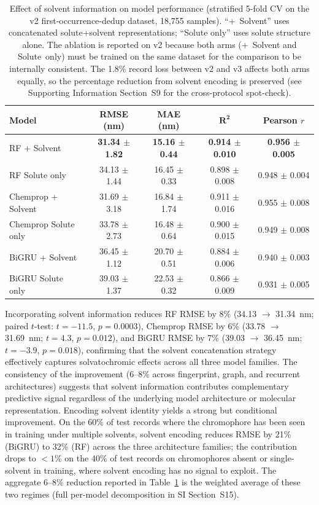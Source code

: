 \documentclass[journal=jcisd8,manuscript=article]{achemso}
\newcommand{\added}[1]{{\color{addedblue}#1}}
\newcommand{\removed}[1]{{\color{removedred}#1}}
\begin{document}
\begin{table}[htbp]
\centering
\caption{Effect of solvent information on model performance (stratified 5-fold CV \added{on the v2 first-occurrence-dedup dataset, 18{,}755 samples}). ``+~Solvent'' uses concatenated solute+solvent representations; ``Solute only'' uses solute structure alone.\added{ The ablation is reported on v2 because both arms (+~Solvent and Solute~only) must be trained on the same dataset for the comparison to be internally consistent. The 1.8\% record loss between v2 and v3 affects both arms equally, so the percentage reduction from solvent encoding is preserved (see Supporting Information Section~S9 for the cross-protocol spot-check).}}
\label{tab:solvent_ablation}
\begin{tabular}{lcccc}
\toprule
\textbf{Model} & \textbf{RMSE (nm)} & \textbf{MAE (nm)} & $\boldsymbol{R^2}$ & \textbf{Pearson $r$} \\
\midrule
RF + Solvent & \textbf{31.34 $\pm$ 1.82} & \textbf{15.16 $\pm$ 0.44} & \textbf{0.914 $\pm$ 0.010} & \textbf{0.956 $\pm$ 0.005} \\
RF Solute only & 34.13 $\pm$ 1.44 & 16.45 $\pm$ 0.33 & 0.898 $\pm$ 0.008 & 0.948 $\pm$ 0.004 \\
\midrule
Chemprop + Solvent & 31.69 $\pm$ 3.18 & 16.84 $\pm$ 1.74 & 0.911 $\pm$ 0.016 & 0.955 $\pm$ 0.008 \\
Chemprop Solute only & 33.78 $\pm$ 2.73 & 16.48 $\pm$ 0.64 & 0.900 $\pm$ 0.015 & 0.949 $\pm$ 0.008 \\
\midrule
BiGRU + Solvent & 36.45 $\pm$ 1.12 & 20.70 $\pm$ 0.51 & 0.884 $\pm$ 0.006 & 0.940 $\pm$ 0.003 \\
BiGRU Solute only & 39.03 $\pm$ 1.37 & 22.53 $\pm$ 0.32 & 0.866 $\pm$ 0.009 & 0.931 $\pm$ 0.005 \\
\bottomrule
\end{tabular}
\end{table}

Incorporating solvent information reduces RF RMSE by 8\% (34.13 $\to$ 31.34~nm; paired $t$-test: $t = -11.5$, $p = 0.0003$), Chemprop RMSE by 6\% (33.78 $\to$ 31.69~nm; $t = 4.3$, $p = 0.012$), and BiGRU RMSE by 7\% (39.03 $\to$ 36.45~nm; $t = -3.9$, $p = 0.018$), confirming that the solvent concatenation strategy effectively captures solvatochromic effects across all three model families.
\removed{The consistency of the improvement (6--8\% across fingerprint, graph, and recurrent architectures) suggests that solvent information contributes complementary predictive signal regardless of the underlying model architecture or molecular representation.}
\added{Encoding solvent identity yields a strong but conditional improvement. On the 60\% of test records where the chromophore has been seen in training under multiple solvents, solvent encoding reduces RMSE by 21\% (BiGRU) to 32\% (RF) across the three architecture families; the contribution drops to $<1$\% on the 40\% of test records on chromophores absent or single-solvent in training, where solvent encoding has no signal to exploit. The aggregate 6--8\% reduction reported in Table~\ref{tab:solvent_ablation} is the weighted average of these two regimes (full per-model decomposition in SI Section~S15).}
\end{document}
